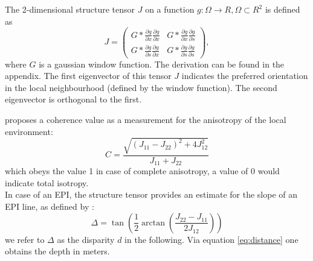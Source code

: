 \documentclass  [
  paper    = a4,
  BCOR     = 10mm,
  twoside,
  fontsize = 12pt,
  fleqn,
  toc      = bibnumbered,
  toc      = listofnumbered,
  numbers  = noendperiod,
  headings = normal,
  listof   = leveldown,
  version  = 3.03
]                                       {scrreprt}
\begin{document}
The 2-dimensional structure tensor $J$  on a function $g:\Omega \rightarrow \!R, \Omega \subset \!R^2 $ is defined as
\begin{equation}\label{eq:structuretensor}
J =\left(
\begin{matrix}
G*\frac{\partial g}{\partial x}\frac{\partial g}{\partial x} & G*\frac{\partial g}{\partial x}\frac{\partial g}{\partial s} \\
G*\frac{\partial g}{\partial s}\frac{\partial g}{\partial x} & G*\frac{\partial g}{\partial s}\frac{\partial g}{\partial s} 
\end{matrix}\right),
\end{equation}
 where $G$ is a gaussian window function. The derivation can be found in the appendix.
 The first eigenvector of this tensor $J$ indicates the preferred orientation in the local neighbourhood (defined by the window function). The second eigenvector is orthogonal to the first. 
 
   \cite{jahne2013digitale} proposes a coherence value as a measurement for the anisotropy of the local environment:
 \begin{equation}\label{eq:coherence}
 C = \frac{\sqrt{(J_{11} - J_{22})^2 + 4J_{12}^2}}{J_{11} + J_{22}}
 \end{equation}
 which obeys the value 1 in case of complete anisotropy, a value of 0 would indicate total isotropy.\\
 In case of an EPI, the structure tensor provides an estimate for the slope of an EPI line, as defined by \cite{bigun1987optimal}:
 \begin{equation}\label{eq:disparity}
 \Delta = \tan\left(\frac{1}{2} \arctan\left( \frac{J_{22}-J_{11}}{2J_{12}}\right)\right)
 \end{equation}
 we refer to $\Delta$ as the disparity $d$ in the following. Via equation \ref{eq:distance} one obtains the depth in meters.
 
\end{document}
